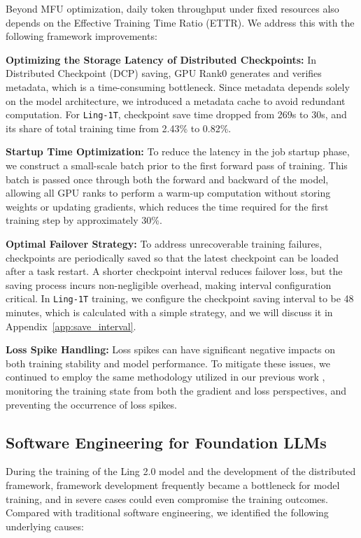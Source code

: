 \documentclass[table]{gtech}
\theoremstyle{definition}
\begin{document}
Beyond MFU optimization, daily token throughput under fixed resources also depends on the Effective Training Time Ratio (ETTR). We address this with the following framework improvements:

\textbf{Optimizing the Storage Latency of Distributed Checkpoints:} 
In Distributed Checkpoint (DCP) saving, GPU Rank0 generates and verifies metadata, which is a time-consuming bottleneck. Since metadata depends solely on the model architecture, we introduced a metadata cache to avoid redundant computation.
For \texttt{Ling-1T}, checkpoint save time dropped from 269s to 30s, and its share of total training time from 2.43\% to 0.82\%.

\textbf{Startup Time Optimization:} To reduce the latency in the job startup phase, we construct a small-scale batch prior to the first forward pass of training.
This batch is passed once through both the forward and backward of the model, allowing all GPU ranks to perform a warm-up computation without storing weights or updating gradients, which reduces the time required for the first training step by approximately 30\%.

\textbf{Optimal Failover Strategy:} To address unrecoverable training failures, checkpoints are periodically saved so that the latest checkpoint can be loaded after a task restart.
A shorter checkpoint interval reduces failover loss, but the saving process incurs non-negligible overhead, making interval configuration critical.
In \texttt{Ling-1T} training, we configure the checkpoint saving interval to be 48 minutes, which is calculated with a simple strategy, and we will discuss it in Appendix~\ref{app:save_interval}.

\textbf{Loss Spike Handling:} Loss spikes can have significant negative impacts on both training stability and model performance. To mitigate these issues, we continued to employ the same methodology utilized in our previous work \citep{team2025every}, monitoring the training state from both the gradient and loss perspectives, and preventing the occurrence of loss spikes.

\subsection{Software Engineering for Foundation LLMs}

During the training of the Ling 2.0 model and the development of the distributed framework, framework development frequently became a bottleneck for model training, and in severe cases could even compromise the training outcomes. Compared with traditional software engineering, we identified the following underlying causes:
\end{document}

